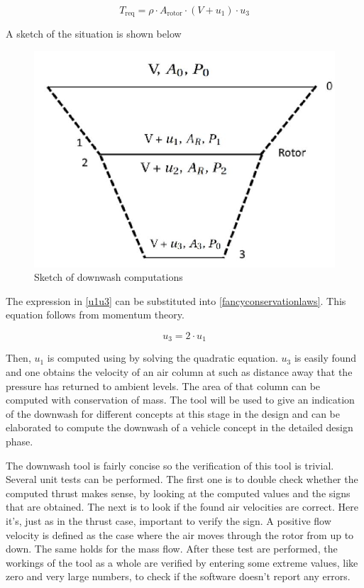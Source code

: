 \begin{equation}
\label{fancyconservationlaws}
    T_\text{req} = \rho\cdot A_\text{rotor}\cdot(V + u_1)\cdot u_3 
\end{equation}

A sketch of the situation is shown below

\begin{figure}[H]
    \centering
    \includegraphics[width=0.5\linewidth]{Figures/downwashsketch.JPG}
    \captionsetup{justification=centering}
    \caption{Sketch of downwash computations}
    \label{downwashsketch}
\end{figure}

The expression in \autoref{u1u3} can be substituted into \autoref{fancyconservationlaws}. This equation follows from momentum theory. 

\begin{equation}
\label{u1u3}
    u_3 = 2\cdot u_1
\end{equation}

Then, $u_1$ is computed using by solving the quadratic equation. $u_3$ is easily found and one obtains the velocity of an air column at such as distance away that the pressure has returned to ambient levels. The area of that column can be computed with conservation of mass. The tool will be used to give an indication of the downwash for different concepts at this stage in the design and can be elaborated to compute the downwash of a vehicle concept in the detailed design phase. 

The downwash tool is fairly concise so the verification of this tool is trivial. Several unit tests can be performed. The first one is to double check whether the computed thrust makes sense, by looking at the computed values and the signs that are obtained. The next is to look if the found air velocities are correct. Here it's, just as in the thrust case, important to verify the sign. A positive flow velocity is defined as the case where the air moves through the rotor from up to down. The same holds for the mass flow. After these test are performed, the workings of the tool as a whole are verified by entering some extreme values, like zero and very large numbers, to check if the software doesn't report any errors.   


